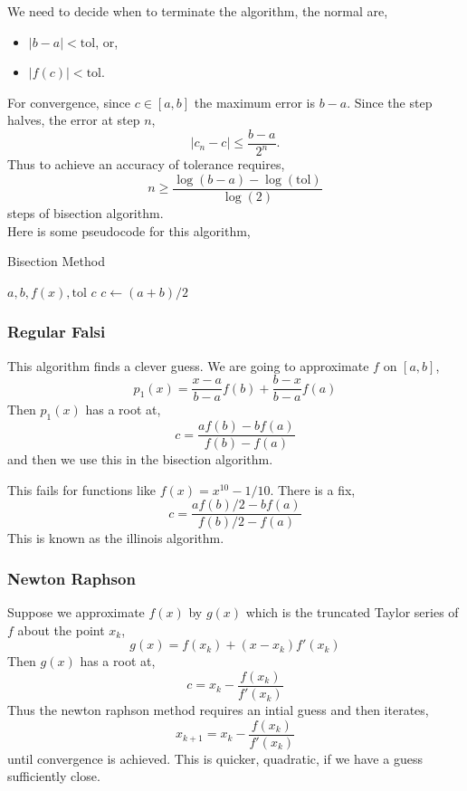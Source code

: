 \noindent
We need to decide when to terminate the algorithm, the normal are,
\begin{itemize}
  \item $|b - a| < \mathrm{tol}$, or,
  \item $|f(c)| < \mathrm{tol}$.
\end{itemize}

\noindent
For convergence, since $c \in [a, b]$ the maximum error is $b - a$. Since the step halves, the error at step $n$,
$$ |c_n - c| \le \frac{b - a}{2^n}. $$
Thus to achieve an accuracy of tolerance requires,
$$ n \ge \frac{\log(b - a) - \log(\mathrm{tol})}{\log (2)} $$
steps of bisection algorithm.\\

\noindent
Here is some pseudocode for this algorithm,
\begin{algorithm}
\caption{Bisection Method}\label{alg:BisectMethod}
\begin{algorithmic}
\Require $a, b, f(x), \mathrm{tol}$
\Ensure $c$
\State $c \gets (a + b)/2$
\Else
\EndIf
\EndWhile
\end{algorithmic}
\end{algorithm}

\subsubsection{Regular Falsi}
This algorithm finds a clever guess. We are going to approximate $f$ on $[a, b]$,
$$ p_1(x) = \frac{x - a}{b - a} f(b) + \frac{b - x}{b - a} f(a)$$
Then $p_1(x)$ has a root at,
$$ c = \frac{af(b) - bf(a)}{f(b) - f(a)} $$
and then we use this in the bisection algorithm.

This fails for functions like $f(x) = x^{10} - 1/10$. There is a fix,
$$ c = \frac{af(b)/2 - bf(a)}{f(b)/2 - f(a)} $$
This is known as the illinois algorithm.

\subsubsection{Newton Raphson}
Suppose we approximate $f(x)$ by $g(x)$ which is the truncated Taylor series of $f$ about the point $x_k$,
$$ g(x) = f(x_k) + (x - x_k)f'(x_k) $$
Then $g(x)$ has a root at,
$$ c = x_k - \frac{f(x_k)}{f'(x_k)} $$
Thus the newton raphson method requires an intial guess and then iterates,
$$ x_{k+1} = x_k - \frac{f(x_k)}{f'(x_k)} $$
until convergence is achieved. This is quicker, quadratic, if we have a guess sufficiently close.

